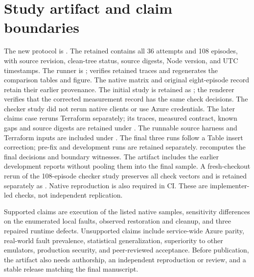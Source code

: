 \documentclass[10pt,a4paper]{article}
\begin{document}
\section{Study artifact and claim boundaries}
The new protocol is . The retained  contains all 36 attempts and 108 episodes, with source revision, clean-tree status, source digests, Node version, and UTC timestamps. The runner is ;  verifies retained traces and regenerates the comparison tables and figure. The native matrix and original eight-episode record retain their earlier provenance. The initial study is retained as ; the renderer verifies that the corrected measurement record has the same check decisions. The checker study did not rerun native clients or use Azure credentials. The later claims case reruns Terraform separately; its traces, measured contract, known gaps and source digests are retained under . The runnable source harness and Terraform inputs are included under . The final three runs follow a Table insert correction; pre-fix and development runs are retained separately.  recomputes the final decisions and boundary witnesses. The artifact includes the earlier development reports without pooling them into the final sample. A fresh-checkout rerun of the 108-episode checker study preserves all check vectors and is retained separately as . Native reproduction is also required in CI. These are implementer-led checks, not independent replication.

Supported claims are execution of the listed native samples, sensitivity differences on the enumerated local faults, observed restoration and cleanup, and three repaired runtime defects. Unsupported claims include service-wide Azure parity, real-world fault prevalence, statistical generalization, superiority to other emulators, production security, and peer-reviewed acceptance. Before publication, the artifact also needs authorship, an independent reproduction or review, and a stable release matching the final manuscript.
\end{document}
